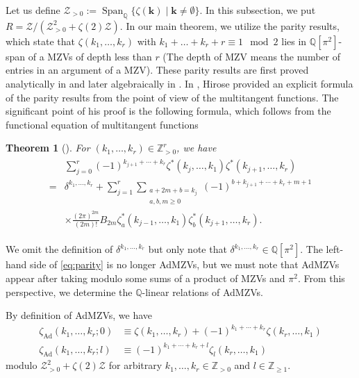 \documentclass[15pt,oneside,reqno]{amsart}
\newtheorem{thm}[df]{Theorem}
\theoremstyle{remark}{
\newtheorem{lem}[df]{Lemma}
\newtheorem{prop}[df]{Proposition}
\newtheorem{ex}[df]{Example}
\newtheorem{rmk}[df]{Remark}
}
\DeclareMathOperator{\Span}{Span}
\newcommand{\Q}{\mathbb{Q}}
\newcommand{\Admzv}[2]{\zeta_{\mathrm{Ad}}(#2;#1)}
\begin{document}
Let us define $\mathcal{Z}_{>0} := \Span_{\mathbb{Q}} \{\zeta(\mathbf{k}) \mid \mathbf{k} \neq \emptyset\}$.
In this subsection, we put  $R = \mathcal{Z} / (\mathcal{Z}_{>0}^2 +\zeta(2)\mathcal{Z})$.
In our main theorem, we utilize the parity results, which state that $\zeta(k_1,\ldots,k_r)$ with $k_1+\dots + k_r + r \equiv 1 \mod 2$ lies in $\Q[\pi^2]$-span of a MZVs of depth less than $r$ (The depth of MZV means the number of entries in an argument of a MZV).
These parity results are first proved analytically in \cite{Tsumura} and later algebraically in \cite{Ihara-Kaneko-Zagier}.
In \cite{Hirose-parity}, Hirose provided an explicit formula of the parity results from the point of view of the multitangent functions.
The significant point of his proof is the following formula, which follows from the functional equation of multitangent functions
\begin{thm}[\cite{Hirose-parity}]
For $(k_1,\ldots,k_r)\in\mathbb{Z}_{>0}^r$, we have
\begin{align}
\begin{aligned}
&\sum_{j = 0}^r (-1)^{k_{j+1}+\cdots + k_r} \zeta^*(k_{j},\ldots,k_1)\zeta^*(k_{j+1},\ldots,k_r) \\
=&\delta^{k_1,\ldots,k_r} + \sum_{j = 1}^r \sum_{\substack{a+2m+b = k_j \\ a,b,m\ge 0}} (-1)^{b+k_{j+1}+\cdots +k_r + m + 1}\\
&\times \frac{(2\pi )^{2m}}{(2m)!}B_{2m}\zeta_a^*(k_{j-1},\ldots,k_1)\zeta_b^*(k_{j+1},\ldots,k_r).
\end{aligned}
\label{eq:parity}
\end{align}
\end{thm}
We omit the definition of $\delta^{k_1,\ldots,k_r}$ but only note that $\delta^{k_1,\ldots,k_r} \in \Q[\pi^2]$.
The left-hand side of \eqref{eq:parity} is no longer AdMZVs, but we must note that AdMZVs appear after taking modulo some sums of a product of MZVs and $\pi^2$.
From this perspective, we determine the $\Q$-linear relations of AdMZVs.

By definition of AdMZVs, we have
\begin{align*}
\Admzv{0}{k_1,\ldots,k_r} &\equiv \zeta(k_1,\ldots,k_r) + (-1)^{k_1+\cdots + k_r}\zeta(k_r,\ldots,k_1) \\
\Admzv{l}{k_1,\ldots,k_r} &\equiv (-1)^{k_1+\cdots + k_r + l} \zeta_l(k_r,\ldots,k_1)
\end{align*}
modulo $\mathcal{Z}_{>0}^2 +\zeta(2)\mathcal{Z}$ for arbitrary $k_1,\ldots,k_r\in\mathbb{Z}_{>0}$ and $l\in\mathbb{Z}_{ \ge 1 }$.
\end{document}

